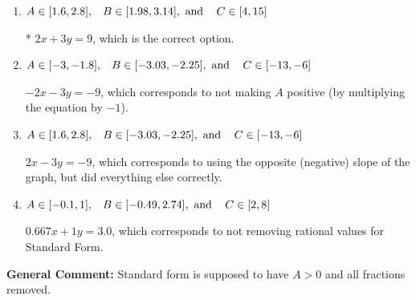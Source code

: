 \documentclass{extbook}[14pt]
\begin{document}
\begin{enumerate}
{\begin{enumerate}[label=\Alph*.]
 $0.667x - 1y = -3.0$, which corresponds to using the opposite (negative) slope of the graph and not removing rational values.
\item \( A \in [1.6, 2.8], \hspace{3mm} B \in [1.98, 3.14], \text{ and } \hspace{3mm} C \in [4, 15] \)

* $2x + 3y = 9$, which is the correct option.
\item \( A \in [-3, -1.8], \hspace{3mm} B \in [-3.03, -2.25], \text{ and } \hspace{3mm} C \in [-13, -6] \)

 $-2x - 3y = -9$, which corresponds to not making $A$ positive (by multiplying the equation by $-1$).
\item \( A \in [1.6, 2.8], \hspace{3mm} B \in [-3.03, -2.25], \text{ and } \hspace{3mm} C \in [-13, -6] \)

 $2x - 3y = -9$, which corresponds to using the opposite (negative) slope of the graph, but did everything else correctly.
\item \( A \in [-0.1, 1], \hspace{3mm} B \in [-0.49, 2.74], \text{ and } \hspace{3mm} C \in [2, 8] \)

 $0.667x + 1y = 3.0$, which corresponds to not removing rational values for Standard Form.
\end{enumerate}

\textbf{General Comment:} Standard form is supposed to have $A > 0$ and all fractions removed.
}
\end{enumerate}
\end{document}
